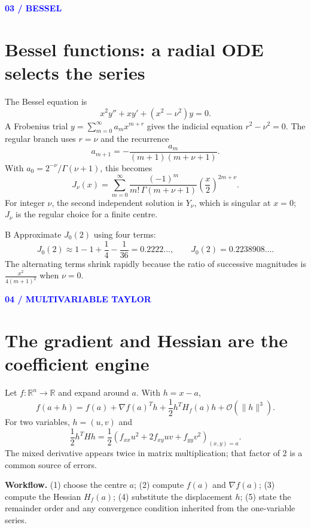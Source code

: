 \documentclass[11pt]{article}
\newcommand{\R}{\mathbb{R}}\newcommand{\C}{\mathbb{C}}\newcommand{\dd}{\,\mathrm d}\newcommand{\order}{\mathcal O}
\newcommand{\sectiontag}[1]{\textcolor{blue}{\sffamily\footnotesize\bfseries #1}\par\vspace{2pt}}
\begin{document}
\sectiontag{03 / BESSEL}\section*{Bessel functions: a radial ODE selects the series}
The Bessel equation is
\[
x^2y''+xy'+(x^2-\nu^2)y=0.
\]
A Frobenius trial $y=\sum_{m=0}^\infty a_m x^{m+r}$ gives the indicial equation $r^2-\nu^2=0$. The regular branch uses $r=\nu$ and the recurrence
\[
a_{m+1}=-\frac{a_m}{(m+1)(m+\nu+1)}.
\]
With $a_0=2^{-\nu}/\Gamma(\nu+1)$, this becomes
\[
J_\nu(x)=\sum_{m=0}^{\infty}\frac{(-1)^m}{m!\,\Gamma(m+\nu+1)}\left(\frac{x}{2}\right)^{2m+\nu}.
\]
For integer $\nu$, the second independent solution is $Y_\nu$, which is singular at $x=0$; $J_\nu$ is the regular choice for a finite centre.
\begin{worked}{B}
Approximate $J_0(2)$ using four terms:
\[
J_0(2)\approx 1-1+\frac{1}{4}-\frac{1}{36}=0.2222\ldots,
\qquad J_0(2)=0.2238908\ldots.
\]
The alternating terms shrink rapidly because the ratio of successive magnitudes is $\frac{x^2}{4(m+1)^2}$ when $\nu=0$.
\end{worked}
\begin{center}
\end{center}

\sectiontag{04 / MULTIVARIABLE TAYLOR}\section*{The gradient and Hessian are the coefficient engine}
Let $f:\R^n\to\R$ and expand around $a$. With $h=x-a$,
\[
f(a+h)=f(a)+\nabla f(a)^{\!T}h+\frac12 h^T H_f(a)h+\order(\|h\|^3).
\]
For two variables, $h=(u,v)$ and
\[
\frac12h^THh=\frac12\left(f_{xx}u^2+2f_{xy}uv+f_{yy}v^2\right)_{(x,y)=a}.
\]
The mixed derivative appears twice in matrix multiplication; that factor of $2$ is a common source of errors.
\begin{keybox}
\textbf{Workflow.} (1) choose the centre $a$; (2) compute $f(a)$ and $\nabla f(a)$; (3) compute the Hessian $H_f(a)$; (4) substitute the displacement $h$; (5) state the remainder order and any convergence condition inherited from the one-variable series.
\end{keybox}
\end{document}

